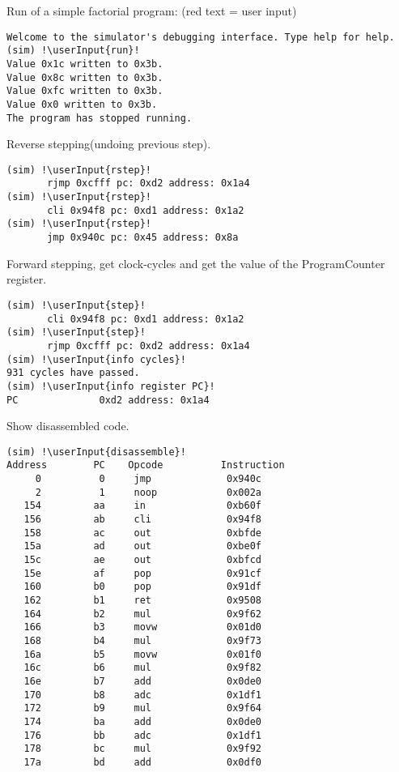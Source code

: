 \begin{block}{\large {}\vphantom{Simulator Debugger}}

\newcommand{\userInput}[1]{
	\textcolor{red}{#1}  
}

\tiny {


Run of a simple factorial program: (red text = user input)
\begin{lstlisting}[escapechar=!]
Welcome to the simulator's debugging interface. Type help for help. 
(sim) !\userInput{run}!
Value 0x1c written to 0x3b.
Value 0x8c written to 0x3b.
Value 0xfc written to 0x3b.
Value 0x0 written to 0x3b.
The program has stopped running.
\end{lstlisting}

Reverse stepping(undoing previous step).
\begin{lstlisting}[escapechar=!]
(sim) !\userInput{rstep}!
       rjmp 0xcfff pc: 0xd2 address: 0x1a4
(sim) !\userInput{rstep}!
       cli 0x94f8 pc: 0xd1 address: 0x1a2
(sim) !\userInput{rstep}!
       jmp 0x940c pc: 0x45 address: 0x8a
\end{lstlisting}
Forward stepping, get clock-cycles and get the value of the ProgramCounter register.
\begin{lstlisting}[escapechar=!]
(sim) !\userInput{step}!
       cli 0x94f8 pc: 0xd1 address: 0x1a2
(sim) !\userInput{step}!
       rjmp 0xcfff pc: 0xd2 address: 0x1a4
(sim) !\userInput{info cycles}!
931 cycles have passed.
(sim) !\userInput{info register PC}!
PC              0xd2 address: 0x1a4
\end{lstlisting}

Show disassembled code.
\begin{lstlisting}[escapechar=!]
(sim) !\userInput{disassemble}!
Address        PC    Opcode          Instruction    
     0          0     jmp             0x940c
     2          1     noop            0x002a
   154         aa     in              0xb60f
   156         ab     cli             0x94f8
   158         ac     out             0xbfde
   15a         ad     out             0xbe0f
   15c         ae     out             0xbfcd
   15e         af     pop             0x91cf
   160         b0     pop             0x91df
   162         b1     ret             0x9508
   164         b2     mul             0x9f62
   166         b3     movw            0x01d0
   168         b4     mul             0x9f73
   16a         b5     movw            0x01f0
   16c         b6     mul             0x9f82
   16e         b7     add             0x0de0
   170         b8     adc             0x1df1
   172         b9     mul             0x9f64
   174         ba     add             0x0de0
   176         bb     adc             0x1df1
   178         bc     mul             0x9f92
   17a         bd     add             0x0df0
\end{lstlisting}

}


\end{block}


